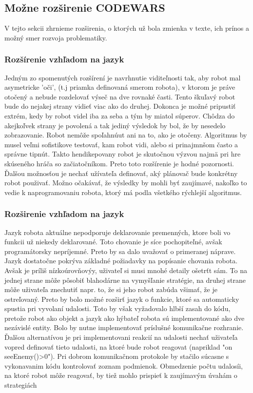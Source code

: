 \subsection{Možne rozširenie CODEWARS}
V tejto sekcii zhrnieme rozširenia, o ktorých už bola zmienka v texte, ich prínos a možný smer rozvoja problematiky. \\
\subsubsection{Rozšírenie vzhľadom na jazyk}
Jedným zo spomenutých rozšírení je navrhnutie viditeľnosti tak,  aby robot mal asymetricke 'oči', (t.j priamka definovaná smerom robota), v ktorom je práve otočený a nebude rozdelovať výseč na dve rovnaké časti. Tento škuľavý robot bude do nejakej strany vidieť viac ako do druhej. Dokonca je možné pripustiť extrém, kedy by robot videl iba za seba a tým by miatol súperov. Chôdza do akejkoľvek strany je povolená a tak jediný výsledok by bol, že by nesedelo zobrazovanie. Robot nemôže spoľahnúut ani na to, ako je otočeny. Algoritmus by musel veľmi sofistikove testovať, kam robot vidi, alebo si prinajmnšom často a správne tipnút. Takto hendikepovany robot je skutočnou výzvou najmä pri hre skúseného hráča so začiatočníkom. Preto toto rozšírenie je  hodné pozornosti. \\ %
Ďalšou možnosťou je nechať užívateľa definovať, aký plánovač bude konkrétny robot použivať. Možno očakávať, že výsledky by mohli byť zaujímavé, nakoľko to vedie k naprogramovaniu robota, ktorý má podla všetkého rýchlejší algoritmus.\\
\subsubsection{Rozširenie vzhľadom na jazyk}
Jazyk robota aktuálne nepodporuje deklarovanie premenných, ktore boli vo funkcii už niekedy deklarované. Toto chovanie je síce pochopiteľné, avšak programátorsky nepríjemné. Preto by sa dalo uvažovať o primeranej náprave. %
Jazyk dostatočne pokrýva základné požiadavky na popísanie chovania robota. Avšak je príliš nízkoúrovňovýy, uživateľ si musi mnohé detaily ošetrťt sám. To na jednej strane môže pôsobiť blahodárne na vymyšľanie stratégie, na druhej strane môže uživateľa znechutiť napr. to, že si jeho robot zabúda všimať, že je ostreľovaný. Preto by bolo možné rozširť jazyk o funkcie, ktoré sa automaticky spustia pri vyvolaní udalosti. Toto by však vyžadovalo  hlbší zasah do kódu, pretože robot ako objekt a jazyk ako hýbateľ robota sú  implementované ako dve nezávislé entity. Bolo by nutne implementovať príslušné komunikačne rozhranie. \\%
Ďalšou alternatívou je pri implementovani reakcií na udalosti nechať uživateľa vopred definovať tieto udalosti, na ktoré bude robot reagovat (napriklad "on seeEnemy()>0"). Pri dobrom komunikačnom protokole by stačilo súcasne s vykonavanim kódu kontrolovať zoznam podmienok. Obmedzenie počtu udalosíi, na ktoré robot môže reagovať, by tiež mohlo prispieť k zaujímavým úvahám o strategiách 

